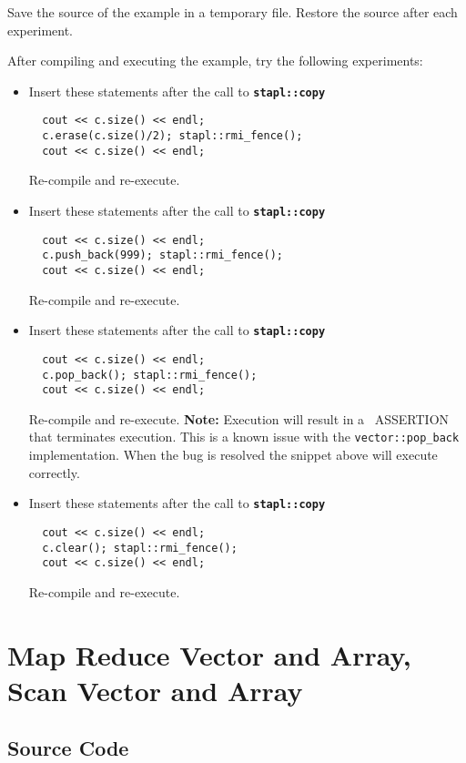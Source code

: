 \documentclass{report}
\begin{document}
Save the source of the example in a temporary file.
Restore the source after each experiment.

After compiling and executing the example, try the following experiments:
\begin{itemize}
\item
Insert these statements after the call to
\texttt{{\bf stapl::copy}}
\begin{verbatim}
  cout << c.size() << endl;
  c.erase(c.size()/2); stapl::rmi_fence();
  cout << c.size() << endl;
\end{verbatim}
Re-compile and re-execute.
\item
Insert these statements after the call to
\texttt{{\bf stapl::copy}}
\begin{verbatim}
  cout << c.size() << endl;
  c.push_back(999); stapl::rmi_fence();
  cout << c.size() << endl;
\end{verbatim}
Re-compile and re-execute.
\item
Insert these statements after the call to
\texttt{{\bf stapl::copy}}
\begin{verbatim}
  cout << c.size() << endl;
  c.pop_back(); stapl::rmi_fence();
  cout << c.size() << endl;
\end{verbatim}
Re-compile and re-execute.
{\bf Note:} Execution will result in a \stapl\ ASSERTION that terminates execution.  This is a known issue with the \texttt{vector::pop\_back} implementation. When the bug is resolved the snippet above will execute correctly.
\item
Insert these statements after the call to
\texttt{{\bf stapl::copy}}
\begin{verbatim}
  cout << c.size() << endl;
  c.clear(); stapl::rmi_fence();
  cout << c.size() << endl;
\end{verbatim}
Re-compile and re-execute.
\end{itemize}


\pagebreak
\section{Map Reduce Vector and Array, Scan Vector and Array }

\subsection{Source Code}


\end{document}
